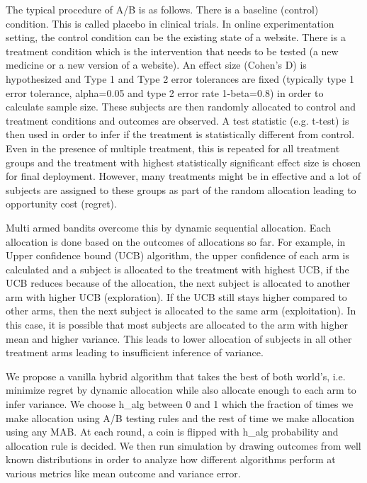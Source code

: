 \documentclass[letterpaper,11pt]{article}
\begin{document}
The typical procedure of A/B is as follows. There is a baseline (control) condition. This is called placebo in clinical trials. In online experimentation setting, the control condition can be the existing state of a website. There is a treatment condition which is the intervention that needs to be tested (a new medicine or a new version of a website). An effect size (Cohen's D) is hypothesized and Type 1 and Type 2 error tolerances are fixed (typically type 1 error tolerance, alpha=0.05 and type 2 error rate 1-beta=0.8) in order to calculate sample size. These subjects are then randomly allocated to control and treatment conditions and outcomes are observed. A test statistic (e.g. t-test) is then used in order to infer if the treatment is statistically different from control. Even in the presence of multiple treatment, this is repeated for all treatment groups and the treatment with highest statistically significant effect size is chosen for final deployment. However, many treatments might be in effective and a lot of subjects are assigned to these groups as part of the random allocation leading to opportunity cost (regret).

Multi armed bandits overcome this by dynamic sequential allocation. Each allocation is done based on the outcomes of allocations so far. For example, in Upper confidence bound (UCB) algorithm, the upper confidence of each arm is calculated and a subject is allocated to the treatment with highest UCB, if the UCB reduces because of the allocation, the next subject is allocated to another arm with higher UCB (exploration). If the UCB still stays higher compared to other arms, then the next subject is allocated to the same arm (exploitation). In this case, it is possible that most subjects are allocated to the arm with higher mean and higher variance. This leads to lower allocation of subjects in all other treatment arms leading to insufficient inference of variance.  

We propose a vanilla hybrid algorithm that takes the best of both world's, i.e. minimize regret by dynamic allocation while also allocate enough to each arm to infer variance. We choose h\_alg between 0 and 1 which the fraction of times we make allocation using A/B testing rules and the rest of time we make allocation using any MAB. At each round, a coin is flipped with h\_alg probability and allocation rule is decided. We then run simulation by drawing outcomes from well known distributions in order to analyze how different algorithms perform at various metrics like mean outcome and variance error. 
\end{document}
